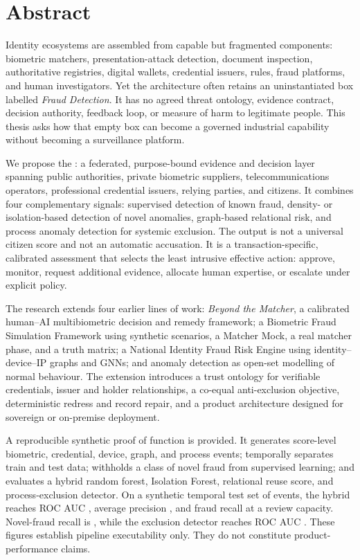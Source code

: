 \chapter*{Abstract}

Identity ecosystems are assembled from capable but fragmented components: biometric matchers, presentation-attack detection, document inspection, authoritative registries, digital wallets, credential issuers, rules, fraud platforms, and human investigators. Yet the architecture often retains an uninstantiated box labelled \emph{Fraud Detection}. It has no agreed threat ontology, evidence contract, decision authority, feedback loop, or measure of harm to legitimate people. This thesis asks how that empty box can become a governed industrial capability without becoming a surveillance platform.

We propose the \product: a federated, purpose-bound evidence and decision layer spanning public authorities, private biometric suppliers, telecommunications operators, professional credential issuers, relying parties, and citizens. It combines four complementary signals: supervised detection of known fraud, density- or isolation-based detection of novel anomalies, graph-based relational risk, and process anomaly detection for systemic exclusion. The output is not a universal citizen score and not an automatic accusation. It is a transaction-specific, calibrated assessment that selects the least intrusive effective action: approve, monitor, request additional evidence, allocate human expertise, or escalate under explicit policy.

The research extends four earlier lines of work: \emph{Beyond the Matcher}, a calibrated human--AI multibiometric decision and remedy framework; a Biometric Fraud Simulation Framework using synthetic scenarios, a Matcher Mock, a real matcher phase, and a truth matrix; a National Identity Fraud Risk Engine using identity--device--IP graphs and GNNs; and anomaly detection as open-set modelling of normal behaviour. The extension introduces a trust ontology for verifiable credentials, issuer and holder relationships, a co-equal anti-exclusion objective, deterministic redress and record repair, and a product architecture designed for sovereign or on-premise deployment.

A reproducible synthetic proof of function is provided. It generates score-level biometric, credential, device, graph, and process events; temporally separates train and test data; withholds a class of novel fraud from supervised learning; and evaluates a hybrid random forest, Isolation Forest, relational reuse score, and process-exclusion detector. On a synthetic temporal test set of \TestN{} events, the hybrid reaches ROC AUC \RocAuc{}, average precision \AvgPrecision{}, and \RecallCapacity{} fraud recall at a \ReviewCapacity{} review capacity. Novel-fraud recall is \NovelRecall{}, while the exclusion detector reaches ROC AUC \ExclusionAuc{}. These figures establish pipeline executability only. They do not constitute product-performance claims.

